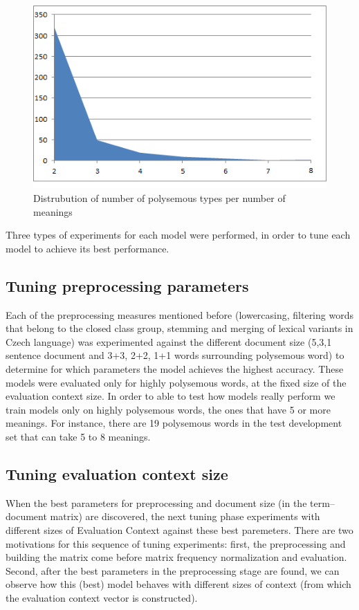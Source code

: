 \begin{figure}[h!]
\includegraphics{img/meaningTypePlot2.png}
\caption{Distrubution of number of polysemous types per number of meanings}
\end{figure}


Three types of experiments for each model were performed, in order to tune each model to achieve its 
best performance.
\subsection{Tuning preprocessing parameters}
Each of the preprocessing measures mentioned before 
(lowercasing, filtering words that belong to the closed class group, stemming and merging of lexical
variants in Czech language) was experimented against the different document size (5,3,1 sentence 
document and 3+3, 2+2, 1+1 words surrounding polysemous word) to determine for which parameters the model achieves the highest accuracy. These models were evaluated only for highly polysemous
words, at the fixed size of the evaluation context size. In  order to able to test how models really perform 
we train models only on highly polysemous words, the ones that have 5 or more meanings.  For instance, there are 19 
polysemous words in the test development set that can take 5 to 8 meanings.

\subsection{Tuning evaluation context size} 
When the best parameters for preprocessing and document size (in the term--document matrix) are 
discovered, the next tuning phase experiments with different sizes of Evaluation Context against these best 
paremeters. There are two motivations for this sequence of tuning experiments: first, the preprocessing
 and building the matrix come before matrix frequency normalization and evaluation. Second, after
the best parameters in the preprocessing stage are found, we can observe how this (best) model behaves 
with different sizes of context (from which the evaluation context vector is constructed). 

